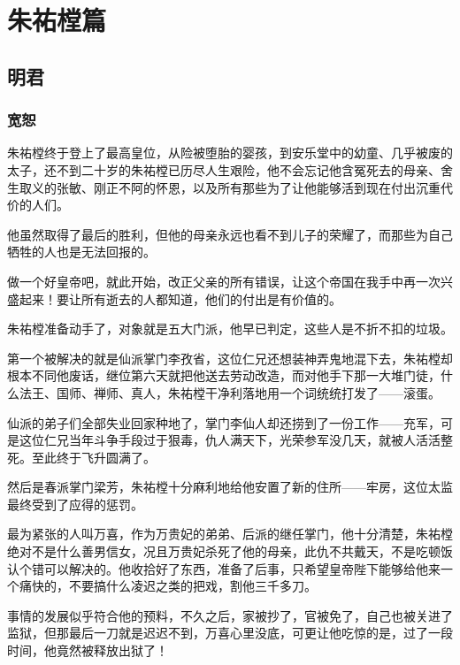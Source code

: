 \chapter*{朱祐樘篇}
\section{明君}
\ifnum{}
	\begin{multicols}{\theparacolNo}
\fi
\subsection{宽恕}
朱祐樘终于登上了最高皇位，从险被堕胎的婴孩，到安乐堂中的幼童、几乎被废的太子，还不到二十岁的朱祐樘已历尽人生艰险，他不会忘记他含冤死去的母亲、舍生取义的张敏、刚正不阿的怀恩，以及所有那些为了让他能够活到现在付出沉重代价的人们。

他虽然取得了最后的胜利，但他的母亲永远也看不到儿子的荣耀了，而那些为自己牺牲的人也是无法回报的。

做一个好皇帝吧，就此开始，改正父亲的所有错误，让这个帝国在我手中再一次兴盛起来！要让所有逝去的人都知道，他们的付出是有价值的。

朱祐樘准备动手了，对象就是五大门派，他早已判定，这些人是不折不扣的垃圾。

第一个被解决的就是仙派掌门李孜省，这位仁兄还想装神弄鬼地混下去，朱祐樘却根本不同他废话，继位第六天就把他送去劳动改造，而对他手下那一大堆门徒，什么法王、国师、禅师、真人，朱祐樘干净利落地用一个词统统打发了——滚蛋。

仙派的弟子们全部失业回家种地了，掌门李仙人却还捞到了一份工作——充军，可是这位仁兄当年斗争手段过于狠毒，仇人满天下，光荣参军没几天，就被人活活整死。至此终于飞升圆满了。

然后是春派掌门梁芳，朱祐樘十分麻利地给他安置了新的住所——牢房，这位太监最终受到了应得的惩罚。

最为紧张的人叫万喜，作为万贵妃的弟弟、后派的继任掌门，他十分清楚，朱祐樘绝对不是什么善男信女，况且万贵妃杀死了他的母亲，此仇不共戴天，不是吃顿饭认个错可以解决的。他收拾好了东西，准备了后事，只希望皇帝陛下能够给他来一个痛快的，不要搞什么凌迟之类的把戏，割他三千多刀。

事情的发展似乎符合他的预料，不久之后，家被抄了，官被免了，自己也被关进了监狱，但那最后一刀就是迟迟不到，万喜心里没底，可更让他吃惊的是，过了一段时间，他竟然被释放出狱了！


\end{multicols}
